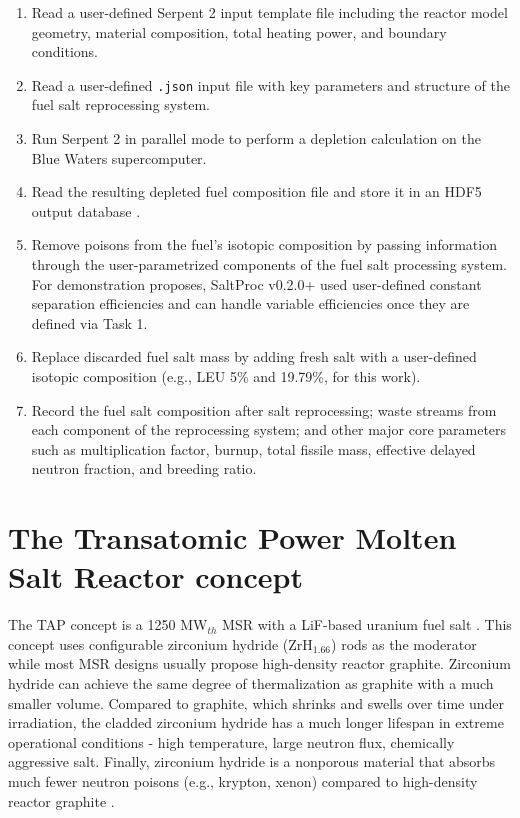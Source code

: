 \documentclass[12pt]{article} %
\begin{document}
\begin{enumerate}
        \item Read a user-defined Serpent 2 \cite{leppanen_serpent_2014} input 
                template file including the reactor  model geometry, material 
                composition, total heating power, and boundary conditions.
        \item Read a user-defined \texttt{.json} input file with key parameters 
                and structure of the fuel salt reprocessing system.
	\item Run Serpent 2 in parallel mode to perform a depletion calculation 
                on the Blue Waters supercomputer.
	\item Read the resulting depleted fuel composition file and store it in 
                an HDF5 output database \cite{the_hdf_group_hierarchical_1997}.
        \item Remove poisons from the fuel's isotopic composition by passing 
                information through the user-parametrized components of the 
                fuel salt processing system. For demonstration proposes, 
                SaltProc v0.2.0+ used user-defined constant separation 
                efficiencies and can handle variable efficiencies once they are 
                defined via Task 1.
        \item Replace discarded fuel salt mass by adding fresh salt with a user-defined 
                isotopic composition (e.g., \gls{LEU} 5\% and 19.79\%, for this 
                work).
        \item Record the fuel salt composition after salt reprocessing; waste 
                streams from each component of the reprocessing system; and 
                other major core parameters such as multiplication factor, 
                burnup, total fissile mass, effective delayed neutron fraction, 
                and breeding ratio.
\end{enumerate}

\section{The Transatomic Power Molten Salt Reactor concept}
The \gls{TAP} concept is a 1250 MW$_{th}$ \gls{MSR} with a LiF-based uranium 
fuel salt \cite{transatomic_power_corporation_technical_2016}. This concept 
uses configurable zirconium hydride (ZrH$_{1.66}$) rods as the moderator while 
most \gls{MSR} designs usually propose high-density reactor graphite. 
Zirconium hydride can achieve the same degree of thermalization as graphite 
with a much smaller volume. Compared to graphite, which shrinks and swells 
over time under irradiation, the cladded zirconium hydride has a much 
longer lifespan in extreme operational conditions - high temperature, large 
neutron flux, chemically aggressive salt. Finally, zirconium hydride is a 
nonporous material that absorbs much fewer neutron poisons (e.g., krypton, 
xenon) compared to high-density reactor graphite 
\cite{transatomic_power_corporation_technical_2016, 
transatomic_power_corporation_neutronics_2016, betzler_two-dimensional_2017}.
\end{document}
